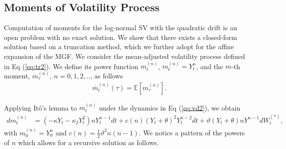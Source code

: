 \documentclass[11pt,a4paper] {article}
\begin{document}
\subsection{Moments of Volatility Process}
Computation of moments for the log-normal SV with the quadratic drift is an open problem with no exact solution. We show that there exists a closed-form solution based on a truncation method, which we further adopt for the affine expansion of the MGF. We consider the mean-adjusted volatility process defined in Eq (\ref{eq:tr2}). We define its power function $m^{(n)}_{t}$, $m^{(n)}_{t} = Y^{n}_{t} $, and the $m$-th moment, $\overline{m}^{(n)}_{\tau}$, $n=0,1,2,..$, as follows
\begin{equation}\label {eq:mvp1}
\begin{split}
& \overline{m}^{(n)}_{t}(\tau) = \mathbb{E}\left[m^{(n)}_{\tau}\right].
\end{split}
\end{equation}

Applying It\^{o}'s lemma to $m^{(n)}_{t}$ under the dynamics in Eq (\ref{eq:vd2}), we obtain
\begin{equation} \label{eq:mvp2}
\begin{split}
dm^{(n)}_{t}& =  \left(- \kappa Y_{t}   - \kappa_{2}Y^{2}_{t}\right)nY_{t}^{n-1}dt +c(n) \left(Y_{t}+\theta\right)^{2}Y_{t}^{n-2}dt  + \vartheta \left(Y_{t}+\theta\right)nY^{n-1} dW^{(*)}_{t},
\end{split}
\end{equation}
with $m^{(n)}_{0}=Y^{n}_{0}$ and $c(n)=\frac{1}{2} \vartheta^{2}n(n-1)$. We notice a pattern of the powers of $n$ which allows for a recursive solution as follows.
\end{document}
